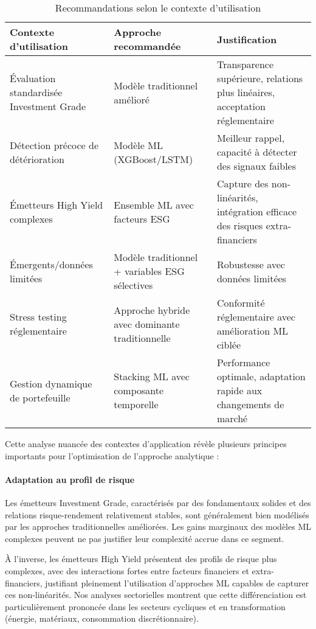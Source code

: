 \begin{table}[htbp]
  \centering
  \caption{Recommandations selon le contexte d'utilisation}
  \begin{tabular}{lll}
    \toprule
    \textbf{Contexte d'utilisation} & \textbf{Approche recommandée} & \textbf{Justification} \\
    \midrule
    Évaluation standardisée Investment Grade & Modèle traditionnel amélioré & Transparence supérieure, relations plus linéaires, acceptation réglementaire \\
    Détection précoce de détérioration & Modèle ML (XGBoost/LSTM) & Meilleur rappel, capacité à détecter des signaux faibles \\
    Émetteurs High Yield complexes & Ensemble ML avec facteurs ESG & Capture des non-linéarités, intégration efficace des risques extra-financiers \\
    Émergents/données limitées & Modèle traditionnel + variables ESG sélectives & Robustesse avec données limitées \\
    Stress testing réglementaire & Approche hybride avec dominante traditionnelle & Conformité réglementaire avec amélioration ML ciblée \\
    Gestion dynamique de portefeuille & Stacking ML avec composante temporelle & Performance optimale, adaptation rapide aux changements de marché \\
    \bottomrule
  \end{tabular}
\end{table}

Cette analyse nuancée des contextes d'application révèle plusieurs principes importants pour l'optimisation de l'approche analytique :

\paragraph{Adaptation au profil de risque} Les émetteurs Investment Grade, caractérisés par des fondamentaux solides et des relations risque-rendement relativement stables, sont généralement bien modélisés par les approches traditionnelles améliorées. Les gains marginaux des modèles ML complexes peuvent ne pas justifier leur complexité accrue dans ce segment.

À l'inverse, les émetteurs High Yield présentent des profils de risque plus complexes, avec des interactions fortes entre facteurs financiers et extra-financiers, justifiant pleinement l'utilisation d'approches ML capables de capturer ces non-linéarités. Nos analyses sectorielles montrent que cette différenciation est particulièrement prononcée dans les secteurs cycliques et en transformation (énergie, matériaux, consommation discrétionnaire).

